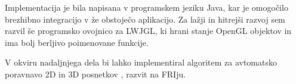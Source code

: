 \documentclass[a4paper, 12pt]{book}
\begin{document}
Implementacija je bila napisana v programskem jeziku Java, kar je omogočilo brezhibno integracijo v že obstoječo aplikacijo. Za lažji in hitrejši razvoj sem razvil še programsko ovojnico za LWJGL, ki hrani stanje OpenGL objektov in ima bolj berljivo poimenovane funkcije.

V okviru nadaljnjega dela bi lahko implementiral algoritem za avtomatsko poravnavo 2D in 3D posnetkov \cite{6507588}, razvit na FRIju.



\end{document}
